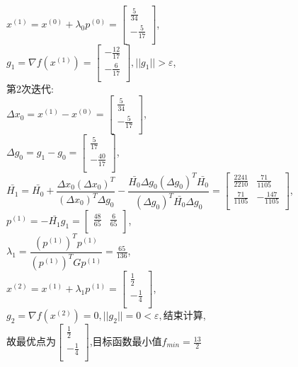 \begin{solution}
    $x^{(1)}=x^{(0)}+\lambda_0p^{(0)}=\begin{bmatrix} \frac{5}{34}\\-\frac{5}{17}\\\end{bmatrix}$,\\
    $g_1=\nabla f(x^{(1)})=\begin{bmatrix} -\frac{12}{17}\\-\frac{6}{17}\\\end{bmatrix},||g_1||>\varepsilon$,\\
    第2次迭代:\\
    $\Delta x_0=x^{(1)}-x^{(0)}=\begin{bmatrix} \frac{5}{34}\\-\frac{5}{17}\\\end{bmatrix}$,\\
    $\Delta g_0=g_1-g_0=\begin{bmatrix} \frac{5}{17}\\-\frac{40}{17}\\\end{bmatrix}$,\\
    $\bar{H_1}=\bar{H_0}+\dfrac{\Delta x_0(\Delta x_0)^T}{(\Delta x_0)^T\Delta g_0}-\dfrac{\bar{H_0}\Delta g_0(\Delta g_0)^T\bar{H_0}}{(\Delta g_0)^T\bar{H_0}\Delta g_0}=\begin{bmatrix}
        \frac{2241}{2210}&\frac{71}{1105}\\
        \frac{71}{1105}&-\frac{147}{1105}\\\end{bmatrix}$,\\
    $p^{(1)}=-\bar{H_1}g_1=\begin{bmatrix}        \frac{48}{65}&\frac{6}{65}\\\end{bmatrix}$,\\
    $\lambda_1=\dfrac{(p^{(1)})^Tp^{(1)}}{(p^{(1)})^TGp^{(1)}}=\frac{65}{136}$,\\
    $x^{(2)}=x^{(1)}+\lambda_1p^{(1)}=\begin{bmatrix} \frac{1}{2}\\-\frac{1}{4}\\\end{bmatrix}$,\\
    $g_2=\nabla f(x^{(2)})=0,||g_2||=0<\varepsilon,\text{结束计算}$,\\
    故最优点为$\begin{bmatrix} \frac{1}{2}\\-\frac{1}{4}\\\end{bmatrix}$,目标函数最小值$f_{min}=\frac{13}{2}$
\end{solution}
